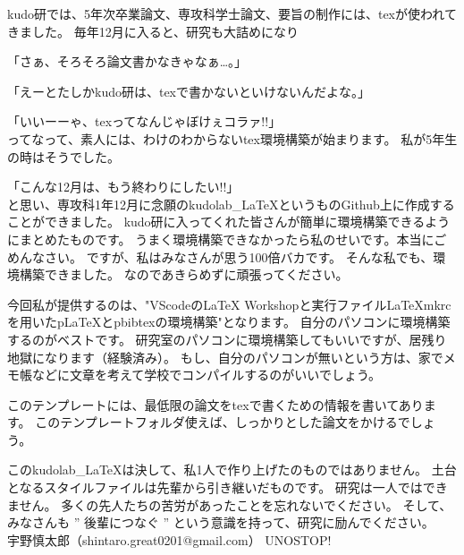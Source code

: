 \begin{jabstract}

    kudo研では、5年次卒業論文、専攻科学士論文、要旨の制作には、texが使われてきました。
    毎年12月に入ると、研究も大詰めになり
    
    「さぁ、そろそろ論文書かなきゃなぁ…。」

    「えーとたしかkudo研は、texで書かないといけないんだよな。」

    「いいーーゃ、texってなんじゃぼけぇコラァ!!」\\
    ってなって、素人には、わけのわからないtex環境構築が始まります。
    私が5年生の時はそうでした。
    
    「こんな12月は、もう終わりにしたい!!」\\
    と思い、専攻科1年12月に念願のkudolab\_\LaTeX というものGithub上に作成することができました。
    kudo研に入ってくれた皆さんが簡単に環境構築できるようにまとめたものです。
    うまく環境構築できなかったら私のせいです。本当にごめんなさい。
    ですが、私はみなさんが思う100倍バカです。
    そんな私でも、環境構築できました。
    なのであきらめずに頑張ってください。

    今回私が提供するのは、"VScodeのLaTeX Workshopと実行ファイルLaTeXmkrcを用いたp\LaTeX とpbibtexの環境構築"となります。
    自分のパソコンに環境構築するのがベストです。
    研究室のパソコンに環境構築してもいいですが、居残り地獄になります（経験済み）。
    もし、自分のパソコンが無いという方は、家でメモ帳などに文章を考えて学校でコンパイルするのがいいでしょう。

    このテンプレートには、最低限の論文をtexで書くための情報を書いてあります。
    このテンプレートフォルダ使えば、しっかりとした論文をかけるでしょう。

    このkudolab\_\LaTeX は決して、私1人で作り上げたのものではありません。
    土台となるスタイルファイルは先輩から引き継いだものです。
    研究は一人ではできません。
    多くの先人たちの苦労があったことを忘れないでください。
    そして、みなさんも ” 後輩につなぐ ” という意識を持って、研究に励んでください。\\

    宇野慎太郎（shintaro.great0201@gmail.com） UNOSTOP!
    
\end{jabstract}
